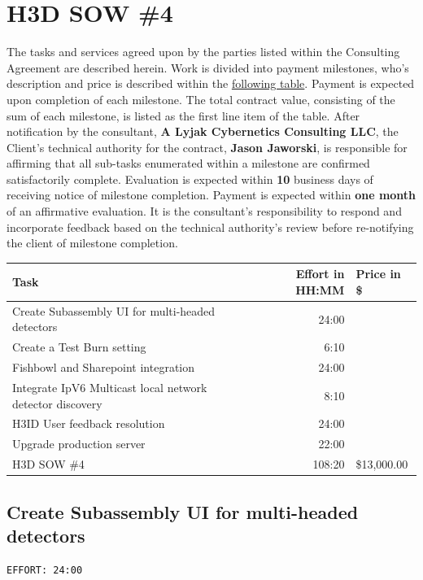 \documentclass[11pt]{article}
\author{Andrew Lyjak}
\date{\today}
\title{}
\begin{document}
\section{H3D SOW \#4}
\label{sec:orgf43a18b}
The tasks and services agreed upon by the parties listed within the Consulting Agreement are
described herein. Work is divided into payment milestones, who's description and price is described
within the \hyperref[orgcbcf01f]{following table}. Payment is expected upon completion of each milestone. The total
contract value, consisting of the sum of each milestone, is listed as the first line item of the
table. After notification by the consultant, \textbf{A Lyjak Cybernetics Consulting LLC}, the Client's
technical authority for the contract, \textbf{Jason Jaworski}, is responsible for affirming that all
sub-tasks enumerated within a milestone are confirmed satisfactorily complete. Evaluation is
expected within \textbf{10} business days of receiving notice of milestone completion. Payment is expected
within \textbf{one month} of an affirmative evaluation. It is the consultant's responsibility to respond
and incorporate feedback based on the technical authority's review before re-notifying the client of
milestone completion.

\label{orgcbcf01f}
\begin{center}
\begin{tabular}{lrl}
Task & Effort in HH:MM & Price in \$\\
\hline
Create Subassembly UI for multi-headed detectors & 24:00 & \\
\hline
Create a Test Burn setting & 6:10 & \\
\hline
Fishbowl and Sharepoint integration & 24:00 & \\
\hline
Integrate IpV6 Multicast local network detector discovery & 8:10 & \\
\hline
H3ID User feedback resolution & 24:00 & \\
\hline
Upgrade production server & 22:00 & \\
\hline
H3D SOW \#4 & 108:20 & \$13,000.00\\
\end{tabular}
\end{center}
\subsection{Create Subassembly UI for multi-headed detectors}
\label{sec:orgc58b6e2}
\begin{verbatim}
EFFORT: 24:00
\end{verbatim}
\end{document}
